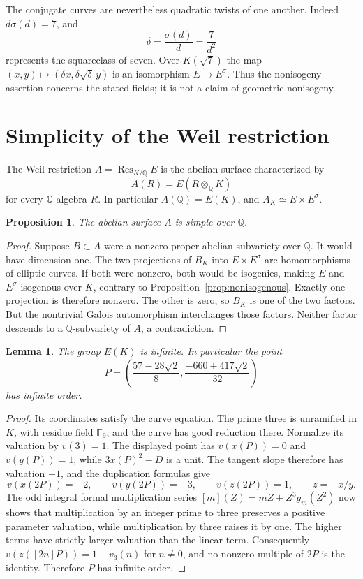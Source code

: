 \documentclass[11pt,a4paper]{article}
\newtheorem{proposition}[theorem]{Proposition}
\newtheorem{lemma}[theorem]{Lemma}
\theoremstyle{definition}\newtheorem{definition}[theorem]{Definition}
\begin{document}
The conjugate curves are nevertheless quadratic twists of one another.
Indeed $d\sigma(d)=7$, and
\[
          \delta=\frac{\sigma(d)}d=\frac7{d^2}
\]
represents the squareclass of seven. Over $K(\sqrt7)$ the map
$(x,y)\mapsto(\delta x,\delta\sqrt\delta\,y)$ is an isomorphism
$E\to E^\sigma$. Thus the nonisogeny assertion concerns the stated
fields; it is not a claim of geometric nonisogeny.

\section{Simplicity of the Weil restriction}

The Weil restriction $A=\operatorname{Res}_{K/\mathbb Q}E$ is the
abelian surface characterized by
\[
                   A(R)=E(R\otimes_{\mathbb Q}K)
\]
for every $\mathbb Q$-algebra $R$. In particular $A(\mathbb Q)=E(K)$,
and $A_K\simeq E\times E^\sigma$.

\begin{proposition}\label{prop:simple}
The abelian surface $A$ is simple over $\mathbb Q$.
\end{proposition}
\begin{proof}
Suppose $B\subset A$ were a nonzero proper abelian subvariety
over $\mathbb Q$. It would have dimension one. The two projections
of $B_K$ into $E\times E^\sigma$ are homomorphisms of elliptic
curves. If both were nonzero, both would be isogenies, making
$E$ and $E^\sigma$ isogenous over $K$, contrary to
Proposition~\ref{prop:nonisogenous}.
Exactly one projection is therefore nonzero. The other is zero,
so $B_K$ is one of the two factors. But the nontrivial Galois
automorphism interchanges those factors. Neither factor descends
to a $\mathbb Q$-subvariety of $A$, a contradiction.
\end{proof}

\begin{lemma}\label{lem:infinite-group}
The group $E(K)$ is infinite. In particular the point
\[
 P=\left(\frac{57-28\sqrt2}{8},
          \frac{-660+417\sqrt2}{32}\right)
\]
has infinite order.
\end{lemma}
\begin{proof}
Its coordinates satisfy the curve equation. The prime three is
unramified in $K$, with residue field $\mathbb F_9$, and the
curve has good reduction there. Normalize its valuation by $v(3)=1$.
The displayed point has $v(x(P))=0$ and $v(y(P))=1$, while
$3x(P)^2-D$ is a unit. The tangent slope therefore has valuation
$-1$, and the duplication formulas give
\[
 v(x(2P))=-2,\qquad v(y(2P))=-3,\qquad v(z(2P))=1,
 \qquad z=-x/y.
\]
The odd integral formal multiplication series
$[m](Z)=mZ+Z^3g_m(Z^2)$ now shows that multiplication by an integer
prime to three preserves a positive parameter valuation, while
multiplication by three raises it by one. The higher terms have
strictly larger valuation than the linear term. Consequently
$v(z([2n]P))=1+v_3(n)$ for $n\ne0$, and no nonzero multiple of
$2P$ is the identity. Therefore $P$ has infinite order.
\end{proof}
\end{document}
